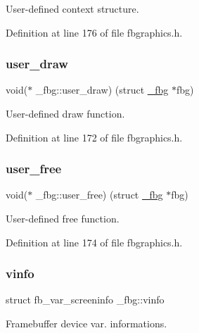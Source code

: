User-\/defined context structure. 



Definition at line 176 of file fbgraphics.\+h.

\mbox{\label{struct__fbg_ac66a762877982c6f381a7cfd54a8f17e}} 
\subsubsection{\texorpdfstring{user\+\_\+draw}{user\_draw}}
{\footnotesize\ttfamily void($\ast$ \+\_\+fbg\+::user\+\_\+draw) (struct \mbox{\hyperlink{struct__fbg}{\+\_\+fbg}} $\ast$fbg)}



User-\/defined draw function. 



Definition at line 172 of file fbgraphics.\+h.

\mbox{\label{struct__fbg_a88d48b502672cfb8bd2c94ea3feac8d0}} 
\subsubsection{\texorpdfstring{user\+\_\+free}{user\_free}}
{\footnotesize\ttfamily void($\ast$ \+\_\+fbg\+::user\+\_\+free) (struct \mbox{\hyperlink{struct__fbg}{\+\_\+fbg}} $\ast$fbg)}



User-\/defined free function. 



Definition at line 174 of file fbgraphics.\+h.

\mbox{\label{struct__fbg_a22447f0d56680de6ff37587b44f7cf4b}} 
\subsubsection{\texorpdfstring{vinfo}{vinfo}}
{\footnotesize\ttfamily struct fb\+\_\+var\+\_\+screeninfo \+\_\+fbg\+::vinfo}



Framebuffer device var. informations. 



